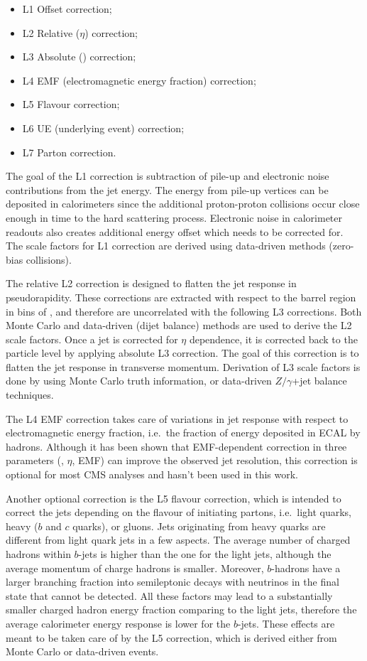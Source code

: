 \begin{itemize}
  \item L1 Offset correction;
  \item L2 Relative ($\eta$) correction;
  \item L3 Absolute (\pt) correction;
  \item L4 EMF (electromagnetic energy fraction) correction;
  \item L5 Flavour correction;
  \item L6 UE (underlying event) correction;
  \item L7 Parton correction.
\end{itemize}

The goal of the L1 correction is subtraction of pile-up and electronic noise contributions from the jet energy. The
energy from pile-up vertices can be deposited in calorimeters since the additional proton-proton collisions occur close
enough in time to the hard scattering process. Electronic noise in calorimeter readouts also creates additional energy
offset which needs to be corrected for. The scale factors for L1 correction are derived using data-driven methods
(zero-bias collisions).

The relative L2 correction is designed to flatten the jet response in pseudorapidity. These corrections are extracted
with respect to the barrel region in bins of \pt, and therefore are uncorrelated with the following L3 corrections. Both
Monte Carlo and data-driven (dijet balance) methods are used to derive the L2 scale factors. Once a jet is corrected for
$\eta$ dependence, it is corrected back to the particle level by applying absolute L3 correction. The goal of this
correction is to flatten the jet response in transverse momentum. Derivation of L3 scale factors is done by using Monte
Carlo truth information, or data-driven $Z/\gamma$+jet balance techniques.

The L4 EMF correction takes care of variations in jet response with respect to electromagnetic energy fraction, i.e.\
the fraction of energy deposited in ECAL by hadrons. Although it has been shown that EMF-dependent correction in three
parameters (\pt, $\eta$, EMF) can improve the observed jet resolution, this correction is optional for most CMS analyses
and hasn't been used in this work.

Another optional correction is the L5 flavour correction, which is intended to correct the jets depending on the flavour
of initiating partons, i.e.\ light quarks, heavy ($b$ and $c$ quarks), or gluons. Jets originating from heavy quarks are
different from light quark jets in a few aspects. The average number of charged hadrons within $b$-jets is higher than
the one for the light jets, although the average momentum of charge hadrons is smaller. Moreover, $b$-hadrons have a
larger branching fraction into semileptonic decays with neutrinos in the final state that cannot be detected. All these
factors may lead to a substantially smaller charged hadron energy fraction comparing to the light jets, therefore the
average calorimeter energy response is lower for the $b$-jets. These effects are meant to be taken care of by the L5
correction, which is derived either from Monte Carlo or data-driven \ttbar events.

